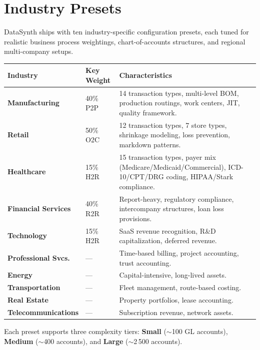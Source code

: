 \documentclass[11pt,a4paper]{article}
\begin{document}
\newpage
\section{Industry Presets}

DataSynth ships with ten industry-specific configuration presets, each tuned
for realistic business process weightings, chart-of-accounts structures, and
regional multi-company setups.

\vspace{0.4em}
\noindent
\renewcommand{\arraystretch}{1.25}
\begin{tabularx}{\textwidth}{>{\bfseries}l l X}
\toprule
\textbf{Industry} & \textbf{Key Weight} & \textbf{Characteristics} \\
\midrule
Manufacturing       & 40\% P2P & 14 transaction types, multi-level BOM, production routings,
                                  work centers, JIT, quality framework. \\
Retail              & 50\% O2C & 12 transaction types, 7 store types, shrinkage modeling,
                                  loss prevention, markdown patterns. \\
Healthcare          & 15\% H2R & 15 transaction types, payer mix (Medicare/Medicaid/Commercial),
                                  ICD-10/CPT/DRG coding, HIPAA/Stark compliance. \\
Financial Services  & 40\% R2R & Report-heavy, regulatory compliance,
                                  intercompany structures, loan loss provisions. \\
Technology          & 15\% H2R & SaaS revenue recognition, R\&D capitalization,
                                  deferred revenue. \\
Professional Svcs.  & --- & Time-based billing, project accounting, trust accounting. \\
Energy              & --- & Capital-intensive, long-lived assets. \\
Transportation      & --- & Fleet management, route-based costing. \\
Real Estate         & --- & Property portfolios, lease accounting. \\
Telecommunications  & --- & Subscription revenue, network assets. \\
\bottomrule
\end{tabularx}
\renewcommand{\arraystretch}{1.0}

\vspace{0.3em}
\noindent
Each preset supports three complexity tiers:
\textbf{Small} ($\sim$100 GL accounts),
\textbf{Medium} ($\sim$400 accounts), and
\textbf{Large} ($\sim$2\,500 accounts).
\end{document}

